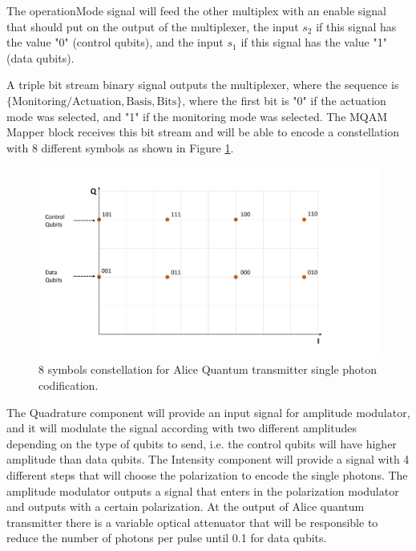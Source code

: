 The operationMode signal will feed the other multiplex with an enable signal that should put on the output of the multiplexer, the input $s_2$ if this signal has the value "0" (control qubits), and the input $s_1$ if this signal has the value "1"(data qubits).

A triple bit stream binary signal outputs the multiplexer, where the sequence is $\{\textrm{Monitoring/Actuation}, \textrm{Basis}, \textrm{Bits}\}$, where the first bit is "0" if the actuation mode was selected, and "1" if the monitoring mode was selected. The MQAM Mapper block receives this bit stream and will be able to encode a constellation with 8 different symbols as shown in Figure \ref{AliceQTxconstellation}.

\begin{figure}[h]
	\centering
	\includegraphics[clip, trim=0.5cm 0.5cm 0.5cm 0.5cm, width=1.0\textwidth]{./lib/AliceQuantumTx/figures/constellation.pdf}
	\caption{8 symbols constellation for Alice Quantum transmitter single photon codification.}\label{AliceQTxconstellation}
\end{figure}

The Quadrature component will provide an input signal for amplitude modulator, and it will modulate the signal according with two different amplitudes depending on the type of qubits to send, i.e. the control qubits will have higher amplitude than data qubits. The Intensity component will provide a signal with 4 different steps that will choose the polarization to encode the single photons. The amplitude modulator outputs a signal that enters in the polarization modulator and outputs with a certain polarization. At the output of Alice quantum transmitter there is a variable optical attenuator that will be responsible to reduce the number of photons per pulse until 0.1 for data qubits.

